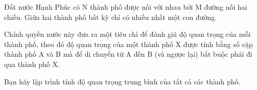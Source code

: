 Đất nước Hạnh Phúc có N thành phố được nối với nhau bởi M đường nối hai chiều. Giữa hai thành phố bất kỳ chỉ có nhiều nhất một con đường.

Chính quyền nước này đưa ra một tiêu chí để đánh giá độ quan trọng của mỗi thành phố, theo đó độ quan trọng của một thành phố X được tính bằng số cặp thành phố A và B mà để di chuyển từ A đến B (và ngược lại) bắt buộc phải đi qua thành phố X.

Bạn hãy lập trình tính độ quan trọng trung bình của tất cả các thành phố.